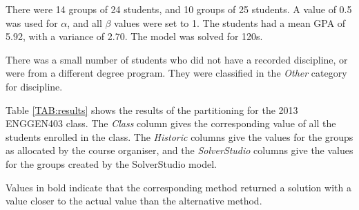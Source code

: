 \documentclass[12pt]{ORSNZ}
\begin{document}
There were 14 groups of 24 students, and 10 groups of 25 students. A value of 0.5 was used for $\alpha$, and all $\beta$ values were set to 1. The students had a mean GPA of 5.92, with a variance of 2.70. The model was solved for 120s. 

There was a small number of students who did not have a recorded discipline, or were from a different degree program. They were classified in the \emph{Other} category for discipline. 

Table \ref{TAB:results} shows the results of the partitioning for the 2013 ENGGEN403 class. The \emph{Class} column gives the corresponding value of all the students enrolled in the class. The \emph{Historic} columns give the values for the groups as allocated by the course organiser, and the \emph{SolverStudio} columns give the values for the groups created by the SolverStudio model.

Values in bold indicate that the corresponding method returned a solution with a value closer to the actual value than the alternative method.
\end{document}
